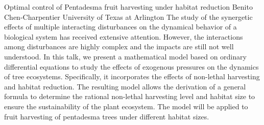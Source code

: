 \begin{addmargin}[2em]{0em}
\vspace{1.5ex}
\abs
{Optimal control of Pentadesma fruit harvesting under habitat reduction}
{Benito Chen-Charpentier}
{University of Texas at Arlington}
{The study of the synergetic effects of multiple interacting disturbances
on the dynamical behavior of a biological system has received extensive
attention.  However, the interactions among disturbances are highly
complex and the impacts are still not well understood. In this talk,
we present a mathematical model based on ordinary differential
equations to study the effects of exogenous pressures on the
dynamics of tree ecosystems. Specifically, it incorporates
the effects of non-lethal harvesting and habitat reduction.
The resulting model allows the derivation of a general formula
to determine the rational non-lethal harvesting level and
habitat size to ensure the sustainability of the plant ecosystem.
The model will be applied to fruit harvesting of pentadesma trees
under different habitat sizes.}
\end{addmargin}
